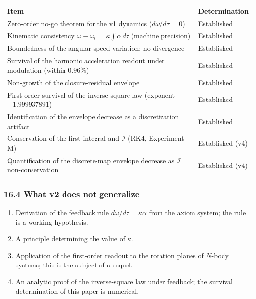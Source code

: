 \documentclass[
  a4paper,
]{article}
\newcounter{none} %
\providecommand{\tightlist}{%
  \setlength{\itemsep}{0pt}\setlength{\parskip}{0pt}}
\begin{document}
{\def\LTcaptype{none} %
\begin{longtable}[]{@{}
  >{\raggedright\arraybackslash}p{}
  >{\raggedright\arraybackslash}p{}@{}}
\toprule\noalign{}
\begin{minipage}[b]{\linewidth}\raggedright
Item
\end{minipage} & \begin{minipage}[b]{\linewidth}\raggedright
Determination
\end{minipage} \\
\midrule\noalign{}
\endhead
\bottomrule\noalign{}
\endlastfoot
Zero-order no-go theorem for the v1 dynamics (\(d\omega/d\tau=0\)) &
Established \\
Kinematic consistency \(\omega-\omega_0=\kappa\int\alpha\,d\tau\)
(machine precision) & Established \\
Boundedness of the angular-speed variation; no divergence &
Established \\
Survival of the harmonic acceleration readout under modulation (within
\(0.96\%\)) & Established \\
Non-growth of the closure-residual envelope & Established \\
First-order survival of the inverse-square law (exponent
\(-1.999937891\)) & Established \\
Identification of the envelope decrease as a discretization artifact &
Established \\
Conservation of the first integral and \(\mathcal I\) (RK4, Experiment
M) & Established (v4) \\
Quantification of the discrete-map envelope decrease as \(\mathcal I\)
non-conservation & Established (v4) \\
\end{longtable}
}

\subsubsection{16.4 What v2 does not
generalize}\label{what-v2-does-not-generalize}

\begin{enumerate}
\def\labelenumi{\arabic{enumi}.}
\tightlist
\item
  Derivation of the feedback rule \(d\omega/d\tau=\kappa\alpha\) from
  the axiom system; the rule is a working hypothesis.
\item
  A principle determining the value of \(\kappa\).
\item
  Application of the first-order readout to the rotation planes of
  \(N\)-body systems; this is the subject of a sequel.
\item
  An analytic proof of the inverse-square law under feedback; the
  survival determination of this paper is numerical.
\end{enumerate}
\end{document}
